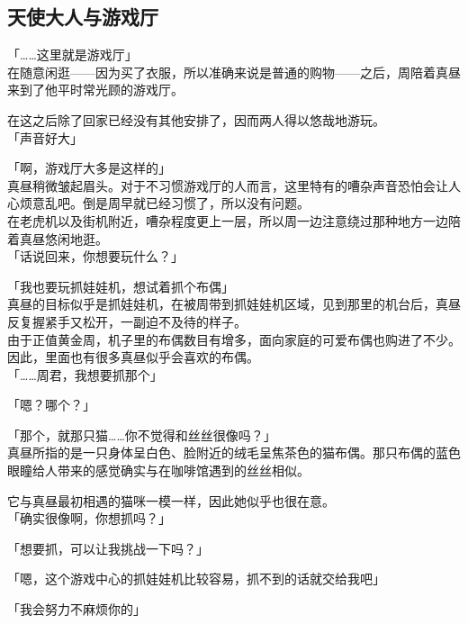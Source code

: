 \subsection{天使大人与游戏厅}

「……这里就是游戏厅」\\

在随意闲逛——因为买了衣服，所以准确来说是普通的购物——之后，周陪着真昼来到了他平时常光顾的游戏厅。

在这之后除了回家已经没有其他安排了，因而两人得以悠哉地游玩。\\

「声音好大」

「啊，游戏厅大多是这样的」\\

真昼稍微皱起眉头。对于不习惯游戏厅的人而言，这里特有的嘈杂声音恐怕会让人心烦意乱吧。倒是周早就已经习惯了，所以没有问题。\\

在老虎机以及街机附近，嘈杂程度更上一层，所以周一边注意绕过那种地方一边陪着真昼悠闲地逛。\\

「话说回来，你想要玩什么？」

「我也要玩抓娃娃机，想试着抓个布偶」\\

真昼的目标似乎是抓娃娃机，在被周带到抓娃娃机区域，见到那里的机台后，真昼反复握紧手又松开，一副迫不及待的样子。\\

由于正值黄金周，机子里的布偶数目有增多，面向家庭的可爱布偶也购进了不少。因此，里面也有很多真昼似乎会喜欢的布偶。\\

「……周君，我想要抓那个」

「嗯？哪个？」

「那个，就那只猫……你不觉得和丝丝很像吗？」\\

真昼所指的是一只身体呈白色、脸附近的绒毛呈焦茶色的猫布偶。那只布偶的蓝色眼瞳给人带来的感觉确实与在咖啡馆遇到的丝丝相似。

它与真昼最初相遇的猫咪一模一样，因此她似乎也很在意。\\

「确实很像啊，你想抓吗？」

「想要抓，可以让我挑战一下吗？」

「嗯，这个游戏中心的抓娃娃机比较容易，抓不到的话就交给我吧」

「我会努力不麻烦你的」\\

